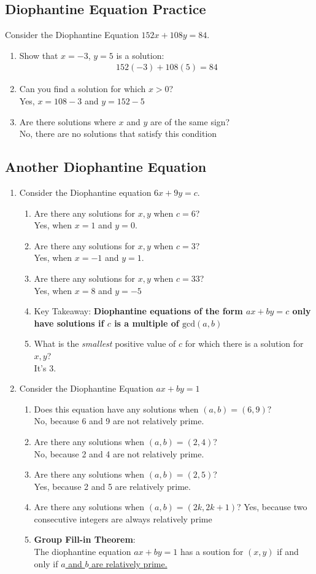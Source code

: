 \documentclass[10pt,oneside]{book}
\newcommand{\gspc}{\vspace{0.13cm}} %
\newcommand{\gline}{\gspc\\} %
\newcommand{\ul}[1]{\underline{#1}}
\begin{document}
\subsection*{Diophantine Equation Practice}
Consider the Diophantine Equation $152x + 108y = 84$.
\begin{enumerate}
	\item [(a)] Show that $x = -3$, $y = 5$ is a solution:
	\begin{align*}
		152(-3) + 108(5) = 84
	\end{align*}
	\item [(b)] Can you find a solution for which $x > 0$?\gline
	Yes, $x = 108-3$ and $y = 152 -5$
	\item [(c, d)] Are there solutions where $x$ and $y$ are of the same sign?\gline
	No, there are no solutions that satisfy this condition 
\end{enumerate}

\subsection*{Another Diophantine Equation}
\begin{enumerate}
	\item Consider the Diophantine equation $6x + 9y = c$.
	\begin{enumerate}
		\item Are there any solutions for $x,y$ when $c = 6$?\gline
		Yes, when $x = 1$ and $y = 0$. 
		\item Are there any solutions for $x,y$ when $c = 3$?\gline
		Yes, when $x = -1$ and $y = 1$.\gline
		\item Are there any solutions for $x,y$ when $c = 33$?\gline
		Yes, when $x = 8$ and $y = -5$
		\item Key Takeaway: \textbf{Diophantine equations of the form $ax + by = c$ only have solutions if $c$ is a multiple of $\text{gcd}(a, b)$}
		\item What is the \textit{smallest} positive value of $c$ for which there is a solution for $x, y$?\gline
		It's 3. 
	\end{enumerate}
	\item Consider the Diophantine Equation $ax + by =1 $
	\begin{enumerate}
		\item Does this equation have any solutions when $(a,b) = (6,9)?$\gline
		No, because 6 and 9 are not relatively prime.
		\item Are there any solutions when $(a,b) = (2,4)$?\gline
		No, because 2 and 4 are not relatively prime.
		\item Are there any solutions when $(a,b) = (2,5)$?\gline
		Yes, because 2 and 5 are relatively prime.
		\item Are there any solutions when $(a,b) = (2k, 2k+1)$?
		Yes, because two consecutive integers are always relatively prime
		\item \textbf{Group Fill-in Theorem}:\\
		The diophantine equation $ax + by = 1$ has a soution for $(x,y)$ if and only if \ul{$a$ and $b$ are relatively prime.}
	\end{enumerate}
\end{enumerate}
\end{document}
